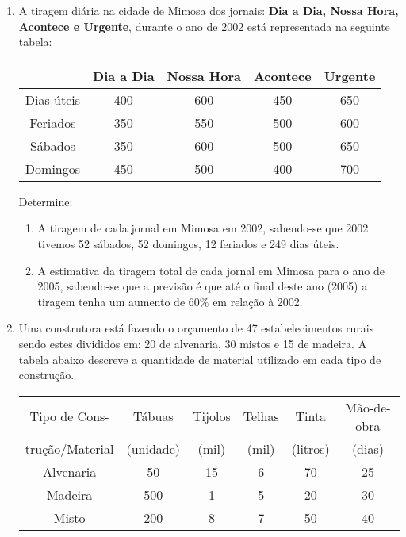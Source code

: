 \documentclass{report}
\begin{document}
\begin{Exercise}
\begin{enumerate}
\item \label{1lista42} A tiragem diária na cidade de Mimosa dos
jornais: {\bf Dia a Dia, Nossa Hora, Acontece e Urgente}, durante
o ano de 2002 está representada na seguinte tabela:

\begin{center}
\begin{tabular}
[c]{c||c|c|c|c}
  & \textbf{ Dia a Dia} & \textbf{ Nossa Hora} & \textbf{ Acontece}
& \textbf{Urgente}\\
\hline\hline
\textrm{Dias úteis} & 400 & 600 & 450 & 650\\
\hline
\textrm{Feriados}& 350 & 550 & 500 & 600\\
\hline
\textrm{Sábados}& 350 & 600 & 500 & 650\\
\hline
\textrm{Domingos} & 450 & 500 & 400 & 700
\end{tabular}
\end{center}

Determine:

\begin{enumerate}
\item A tiragem de cada jornal em Mimosa em 2002, sabendo-se que
2002 tivemos 52 sábados, 52 domingos, 12 feriados e 249 dias
úteis.

\item A estimativa da tiragem total de cada jornal em Mimosa para
o ano de 2005, sabendo-se que a previsão é que até o final deste
ano (2005) a tiragem tenha um aumento de $60\%$ em relação à 2002.
\end{enumerate}




\item \label{1lista43} Uma construtora está fazendo o orçamento de
47 estabelecimentos rurais sendo estes divididos em: 20 de
alvenaria, 30 mistos e 15 de madeira. A tabela abaixo descreve a
quantidade de material utilizado em cada tipo de construção.

\begin{center}
\begin{tabular}
[c]{c||c|c|c|c|c}
 \textrm{Tipo de Cons-} & \textrm{ Tábuas} & \textrm{ Tijolos} &
 \textrm{ Telhas}& \textrm{ Tinta}& \textrm{Mão-de-obra}\\
 \textrm{trução/Material} & \textrm{ (unidade)} & \textrm{ (mil)} &
 \textrm{ (mil)}& \textrm{(litros)}& \textrm{(dias)}\\
\hline\hline
\textrm{Alvenaria} & 50 & 15 & 6 & 70 & 25\\
\hline
\textrm{Madeira} & 500 & 1 & 5 & 20 & 30\\
\hline
\textrm{Misto} & 200 & 8 & 7 & 50 & 40
\end{tabular}
\end{center}


\end{enumerate}
\end{Exercise}
\end{document}
